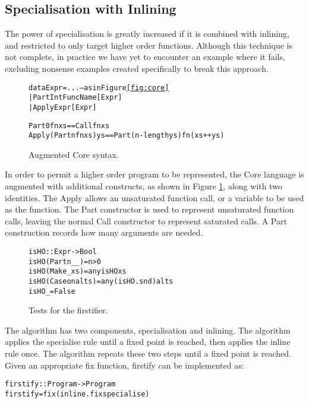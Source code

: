 \documentclass[preprint]{sigplanconf}
\newcommand{\C}[1]{\textsf{#1}}
\newenvironment{code}{\begin{alltt}\small}{\end{alltt}}
\begin{document}
\subsection{Specialisation with Inlining}

The power of specialisation is greatly increased if it is combined with inlining, and restricted to only target higher order functions. Although this technique is not complete, in practice we have yet to encounter an example where it fails, excluding nonsense examples created specifically to break this approach.

\begin{figure}
\begin{code}
data Expr  =  ... -- as in Figure {\ref{fig:core}}
           |  Part   Int FuncName [Expr]
           |  Apply  Expr [Expr]

Part 0 fn xs == Call fn xs
Apply (Part n fn xs) ys == Part (n - length ys) fn (xs ++ ys)
\end{code}
\caption{Augmented Core syntax.}
\label{fig:core_ho}
\end{figure}

In order to permit a higher order program to be represented, the Core language is augmented with additional constructs, as shown in Figure \ref{fig:core_ho}, along with two identities. The \C{Apply} allows an unsaturated function call, or a variable to be used as the function. The \C{Part} constructor is used to represent unsaturated function calls, leaving the normal \C{Call} constructor to represent saturated calls. A \C{Part} construction records how many arguments are needed.

\begin{figure}
\begin{code}
isHO :: Expr -> Bool
isHO (Part n _ _)    = n > 0
isHO (Make _ xs)     = any isHO xs
isHO (Case on alts)  = any (isHO . snd) alts
isHO _               = False
\end{code}
\caption{Tests for the firstifier.}
\label{fig:isHO}
\end{figure}

The algorithm has two components, specialisation and inlining. The algorithm applies the specialise rule until a fixed point is reached, then applies the inline rule once. The algorithm repeats these two steps until a fixed point is reached. Given an appropriate \C{fix} function, \C{firstify} can be implemented as:

\begin{code}
firstify :: Program -> Program
firstify = fix (inline . fix specialise)
\end{code}
\end{document}

